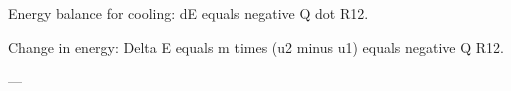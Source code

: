 Energy balance for cooling:  
dE equals negative Q dot R12.  

Change in energy:  
Delta E equals m times (u2 minus u1) equals negative Q R12.  

---